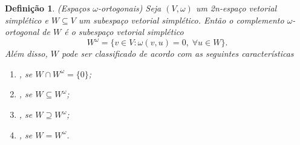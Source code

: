 \documentclass[12pt]{book}
\newtheorem{definicao}[teorema]{Definição}
\newcommand{\espacoSimpleticoOrtogonal}[1]{#1^{\omega}}
\begin{document}
	\begin{definicao}\label{definicao_subespaco_simpletico_ortogonais}
		(Espaços $\omega$-ortogonais) Seja $(V, \omega)$ um 2n-espaço vetorial simplético e $W\subseteq V$ um subespaço vetorial simplético. Então o complemento $\omega$-ortogonal de $W$ é o subespaço vetorial simplético
		$$
		W^{\omega} = \{v\in V: \omega(v,u) = 0,\;\forall u\in W \}.
		$$
		Além disso, $W$ pode ser classificado de acordo com as seguintes características
		\begin{enumerate}
			\item {}, se $W\cap \espacoSimpleticoOrtogonal{W} = \{0\}$;
			
			\item {}, se $W \subseteq \espacoSimpleticoOrtogonal{W}$;
			
			\item {}, se $W\supseteq \espacoSimpleticoOrtogonal{W}$;
			
			\item {}, se $W =\espacoSimpleticoOrtogonal{W}$.
		\end{enumerate}
	\end{definicao}
	
\end{document}
